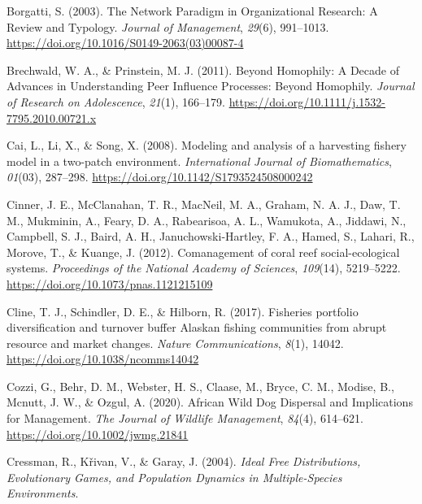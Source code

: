 \documentclass[
  12pt,
]{article}
\newlength{\cslhangindent}
\newlength{\cslentryspacingunit} %
\newenvironment{CSLReferences}[2] %
 {%
  \setlength{\parindent}{0pt}
  \ifodd #1
  \let\oldpar\par
  \def\par{\hangindent=\cslhangindent\oldpar}
  \fi
  \setlength{\parskip}{#2\cslentryspacingunit}
 }%
 {}
\begin{document}
\begin{CSLReferences}{1}{2}
\leavevmode{}%
Borgatti, S. (2003). The {Network Paradigm} in {Organizational Research}: {A Review} and {Typology}. \emph{Journal of Management}, \emph{29}(6), 991--1013. \url{https://doi.org/10.1016/S0149-2063(03)00087-4}

\leavevmode{}%
Brechwald, W. A., \& Prinstein, M. J. (2011). Beyond {Homophily}: {A Decade} of {Advances} in {Understanding Peer Influence Processes}: {Beyond Homophily}. \emph{Journal of Research on Adolescence}, \emph{21}(1), 166--179. \url{https://doi.org/10.1111/j.1532-7795.2010.00721.x}

\leavevmode{}%
Cai, L., Li, X., \& Song, X. (2008). Modeling and analysis of a harvesting fishery model in a two-patch environment. \emph{International Journal of Biomathematics}, \emph{01}(03), 287--298. \url{https://doi.org/10.1142/S1793524508000242}

\leavevmode{}%
Cinner, J. E., McClanahan, T. R., MacNeil, M. A., Graham, N. A. J., Daw, T. M., Mukminin, A., Feary, D. A., Rabearisoa, A. L., Wamukota, A., Jiddawi, N., Campbell, S. J., Baird, A. H., Januchowski-Hartley, F. A., Hamed, S., Lahari, R., Morove, T., \& Kuange, J. (2012). Comanagement of coral reef social-ecological systems. \emph{Proceedings of the National Academy of Sciences}, \emph{109}(14), 5219--5222. \url{https://doi.org/10.1073/pnas.1121215109}

\leavevmode{}%
Cline, T. J., Schindler, D. E., \& Hilborn, R. (2017). Fisheries portfolio diversification and turnover buffer {Alaskan} fishing communities from abrupt resource and market changes. \emph{Nature Communications}, \emph{8}(1), 14042. \url{https://doi.org/10.1038/ncomms14042}

\leavevmode{}%
Cozzi, G., Behr, D. M., Webster, H. S., Claase, M., Bryce, C. M., Modise, B., Mcnutt, J. W., \& Ozgul, A. (2020). African {Wild Dog Dispersal} and {Implications} for {Management}. \emph{The Journal of Wildlife Management}, \emph{84}(4), 614--621. \url{https://doi.org/10.1002/jwmg.21841}

\leavevmode{}%
Cressman, R., Křivan, V., \& Garay, J. (2004). \emph{Ideal {Free Distributions}, {Evolutionary Games}, and {Population Dynamics} in {Multiple-Species Environments}}.


\end{CSLReferences}
\end{document}
